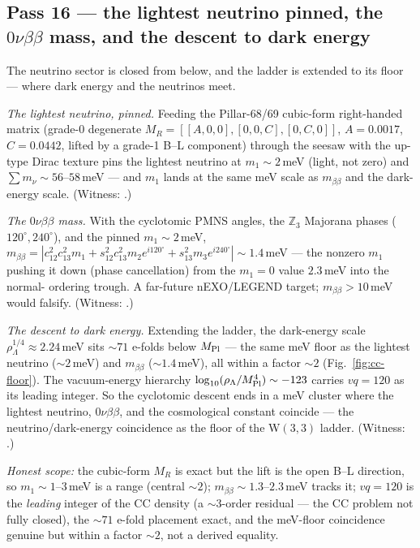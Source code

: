 \documentclass[11pt]{article}
\begin{document}
\subsection{Pass 16 --- the lightest neutrino pinned, the $0\nu\beta\beta$ mass, and the descent to dark energy}
\label{sec:capstone-sixteen}

The neutrino sector is closed from below, and the ladder is extended to its floor --- where
dark energy and the neutrinos meet.

\emph{The lightest neutrino, pinned.} Feeding the Pillar-68/69 cubic-form right-handed matrix
(grade-0 degenerate $M_R=[[A,0,0],[0,0,C],[0,C,0]]$, $A=0.0017$, $C=0.0442$, lifted by a
grade-1 B--L component) through the seesaw with the up-type Dirac texture pins the lightest
neutrino at $m_1\sim2$\,meV (light, not zero) and $\sum m_\nu\sim56$--$58$\,meV --- and $m_1$
lands at the same meV scale as $m_{\beta\beta}$ and the dark-energy scale. (Witness:
.)

\emph{The $0\nu\beta\beta$ mass.} With the cyclotomic PMNS angles, the $\mathbb{Z}_3$ Majorana
phases ($120^\circ,240^\circ$), and the pinned $m_1\sim2$\,meV, $m_{\beta\beta}=|c_{12}^2c_{13}^2
m_1+s_{12}^2c_{13}^2m_2e^{i120^\circ}+s_{13}^2m_3e^{i240^\circ}|\sim1.4$\,meV --- the nonzero
$m_1$ pushing it down (phase cancellation) from the $m_1{=}0$ value $2.3$\,meV into the normal-
ordering trough. A far-future nEXO/LEGEND target; $m_{\beta\beta}>10$\,meV would falsify.
(Witness: .)

\emph{The descent to dark energy.} Extending the ladder, the dark-energy scale
$\rho_\Lambda^{1/4}\approx2.24$\,meV sits $\sim71$ e-folds below $M_{\rm Pl}$ --- the same meV
floor as the lightest neutrino ($\sim2$\,meV) and $m_{\beta\beta}$ ($\sim1.4$\,meV), all within
a factor $\sim2$ (Fig.~\ref{fig:cc-floor}). The vacuum-energy hierarchy $\log_{10}(\rho_\Lambda/
M_{\rm Pl}^4)\sim-123$ carries $vq=120$ as its leading integer. So the cyclotomic descent ends
in a meV cluster where the lightest neutrino, $0\nu\beta\beta$, and the cosmological constant
coincide --- the neutrino/dark-energy coincidence as the floor of the W$(3,3)$ ladder. (Witness:
.)



\emph{Honest scope:} the cubic-form $M_R$ is exact but the lift is the open B--L direction, so
$m_1\sim1$--$3$\,meV is a range (central $\sim2$); $m_{\beta\beta}\sim1.3$--$2.3$\,meV tracks it;
$vq=120$ is the \emph{leading} integer of the CC density (a $\sim3$-order residual --- the CC
problem not fully closed), the $\sim71$ e-fold placement exact, and the meV-floor coincidence
genuine but within a factor $\sim2$, not a derived equality.
\end{document}
